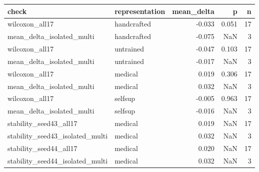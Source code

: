 \begin{tabular}{llrrr}
\toprule
check & representation & mean\_delta & p & n \\
\midrule
wilcoxon\_all17 & handcrafted & -0.033 & 0.051 & 17 \\
mean\_delta\_isolated\_multi & handcrafted & -0.075 & NaN & 3 \\
wilcoxon\_all17 & untrained & -0.047 & 0.103 & 17 \\
mean\_delta\_isolated\_multi & untrained & -0.017 & NaN & 3 \\
wilcoxon\_all17 & medical & 0.019 & 0.306 & 17 \\
mean\_delta\_isolated\_multi & medical & 0.032 & NaN & 3 \\
wilcoxon\_all17 & selfsup & -0.005 & 0.963 & 17 \\
mean\_delta\_isolated\_multi & selfsup & -0.016 & NaN & 3 \\
stability\_seed43\_all17 & medical & 0.019 & NaN & 17 \\
stability\_seed43\_isolated\_multi & medical & 0.032 & NaN & 3 \\
stability\_seed44\_all17 & medical & 0.020 & NaN & 17 \\
stability\_seed44\_isolated\_multi & medical & 0.032 & NaN & 3 \\
\bottomrule
\end{tabular}
